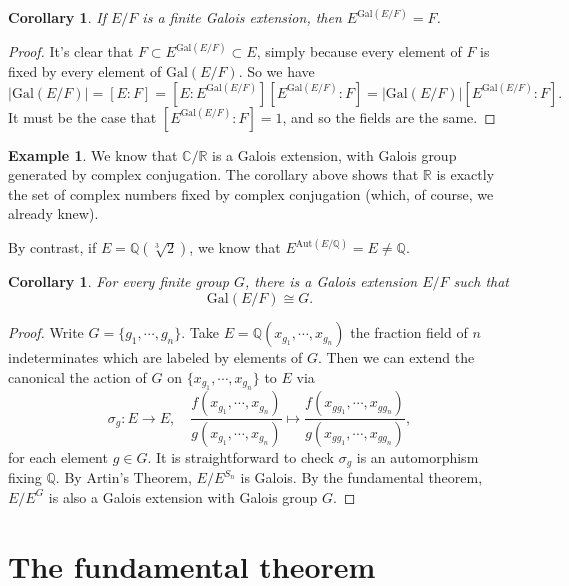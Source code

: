 \documentclass[12pt]{report}
\newtheorem{cor}[thm]{Corollary}
\theoremstyle{definition}
\newtheorem{example}[thm]{Example}
\def\CC{\mathbb{C}}
\def\QQ{\mathbb{Q}}
\def\RR{\mathbb{R}}
\def\Aut{\text{Aut}}
\def\Gal{\text{Gal}}
\begin{document}
\begin{cor}\label{artincor}
    If $E/F$ is a finite Galois extension, then $E^{\Gal(E/F)} = F$.
\end{cor}

\begin{proof}
    It's clear that $F \subset E^{\Gal(E/F)}\subset E$, simply because every element of $F$ is fixed by every element of $\Gal(E/F)$. So we have $$|\Gal(E/F)|=[E : F] = [E : E^{\Gal(E/F)}][E^{\Gal(E/F)} : F] =|\Gal(E/F)|[E^{\Gal(E/F)} : F].$$
    It must be the case that $[E^{\Gal(E/F)} : F] = 1$, and so the fields are the same.
\end{proof}

\begin{example}
    We know that $\CC/\RR$ is a Galois extension, with Galois group generated by complex conjugation. The corollary above shows that $\RR$ is exactly the set of complex numbers fixed by complex conjugation (which, of course, we already knew).

    By contrast, if $E =\QQ(\sqrt[3]{2})$, we know that $E^{\Aut(E/\QQ)} = E \not= \QQ$.
\end{example}


\begin{cor}
    For every finite group $G$, there is a Galois extension $E/F$ such that $$\Gal(E/F) \cong G.$$
\end{cor}

\begin{proof}
    Write $G=\{g_1,\cdots,g_n\}$. Take $E=\QQ(x_{g_1},\cdots,x_{g_n})$ the fraction field of $n$ indeterminates which are labeled by elements of $G$. Then we can extend the canonical the action of $G$ on $\{x_{g_1},\cdots,x_{g_n}\}$ to $E$ via $$\sigma_g: E\to E,\quad  \frac{f(x_{g_1},\cdots,x_{g_n})}{g(x_{g_1},\cdots,x_{g_n})}\mapsto  \frac{f(x_{gg_1},\cdots,x_{gg_n})}{g(x_{gg_1},\cdots,x_{gg_n})},$$ for each element $g\in G$. It is straightforward to check $\sigma_g$ is an automorphism fixing $\QQ$. By Artin's Theorem, $E/E^{S_n}$ is Galois. By the fundamental theorem, $E/E^G$ is also a Galois extension with Galois group $G$.
\end{proof}


\section{The fundamental theorem}
\end{document}
